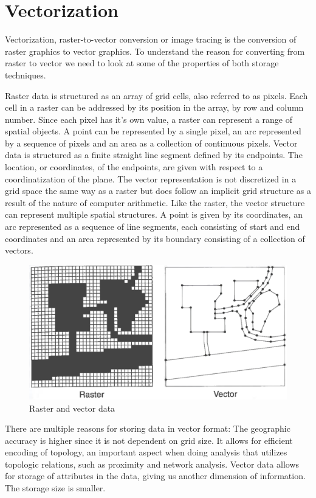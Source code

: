 \chapter{Vectorization}\label{chp:vectorization}
Vectorization, raster-to-vector conversion or image tracing is the conversion of raster graphics to vector graphics. To understand the reason for converting from raster to vector we need to look at some of the properties of both storage techniques.

Raster data is structured as an array of grid cells, also referred to as pixels. Each cell in a raster can be addressed by its position in the array, by row and column number. Since each pixel has it's own value, a raster can represent a range of spatial objects. A point can be represented by a single pixel, an arc represented by a sequence of pixels and an area as a collection of continuous pixels. Vector data is structured as a finite straight line segment defined by its endpoints. The location, or coordinates, of the endpoints, are given with respect to a coordinatization of the plane. The vector representation is not discretized in a grid space the same way as a raster but does follow an implicit grid structure as a result of the nature of computer arithmetic. Like the raster, the vector structure can represent multiple spatial structures. A point is given by its coordinates, an arc represented as a sequence of line segments, each consisting of start and end coordinates and an area represented by its boundary consisting of a collection of vectors.

\begin{figure}[H]
	\centering
	\includegraphics[width=0.8\linewidth]{fig/rastervector.png}
	\caption{Raster and vector data \cite{Worboys2003}}
	\label{fig:rastervsvector}
\end{figure}

There are multiple reasons for storing data in vector format: The geographic accuracy is higher since it is not dependent on grid size. It allows for efficient encoding of topology, an important aspect when doing analysis that utilizes topologic relations, such as proximity and network analysis. Vector data allows for storage of attributes in the data, giving us another dimension of information. The storage size is smaller.

